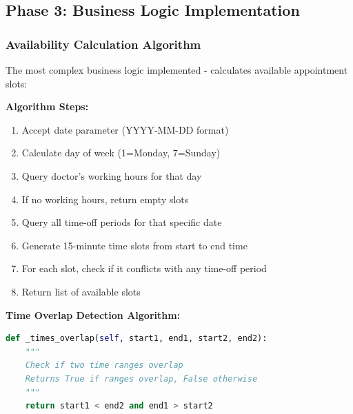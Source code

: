 \documentclass[12pt,a4paper]{article}
\begin{document}
\subsection{Phase 3: Business Logic Implementation}

\subsubsection{Availability Calculation Algorithm}
The most complex business logic implemented - calculates available appointment slots:

\textbf{Algorithm Steps:}
\begin{enumerate}
    \item Accept date parameter (YYYY-MM-DD format)
    \item Calculate day of week (1=Monday, 7=Sunday)
    \item Query doctor's working hours for that day
    \item If no working hours, return empty slots
    \item Query all time-off periods for that specific date
    \item Generate 15-minute time slots from start to end time
    \item For each slot, check if it conflicts with any time-off period
    \item Return list of available slots
\end{enumerate}

\textbf{Time Overlap Detection Algorithm:}
\begin{lstlisting}[language=Python,caption={Overlap Detection}]
def _times_overlap(self, start1, end1, start2, end2):
    """
    Check if two time ranges overlap
    Returns True if ranges overlap, False otherwise
    """
    return start1 < end2 and end1 > start2
\end{lstlisting}
\end{document}
